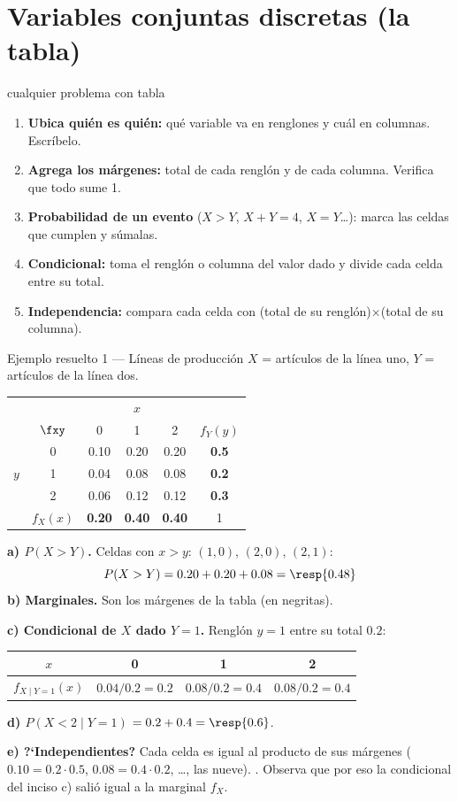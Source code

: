 \section{Variables conjuntas discretas (la tabla)}

\begin{receta}{cualquier problema con tabla}
\begin{enumerate}
\item \textbf{Ubica qui\'en es qui\'en:} qu\'e variable va en renglones y cu\'al en columnas. Escr\'ibelo.
\item \textbf{Agrega los m\'argenes:} total de cada rengl\'on y de cada columna. Verifica que todo sume 1.
\item \textbf{Probabilidad de un evento} ($X>Y$, $X+Y=4$, $X=Y$\ldots): marca las celdas que cumplen y s\'umalas.
\item \textbf{Condicional:} toma el rengl\'on o columna del valor dado y divide cada celda entre su total.
\item \textbf{Independencia:} compara cada celda con (total de su rengl\'on)$\times$(total de su columna).
\end{enumerate}
\end{receta}

\begin{ejemplo}{Ejemplo resuelto 1 --- L\'ineas de producci\'on }
$X$ = art\'iculos de la l\'inea uno, $Y$ = art\'iculos de la l\'inea dos.
\begin{center}
\begin{tabular}{cc|ccc|c}
 & & \multicolumn{3}{c|}{$x$} & \\
 & $\fxy$ & 0 & 1 & 2 & $f_Y(y)$\\ \hline
 \multirow{3}{*}{$y$} & 0 & 0.10 & 0.20 & 0.20 & \textbf{0.5}\\
 & 1 & 0.04 & 0.08 & 0.08 & \textbf{0.2}\\
 & 2 & 0.06 & 0.12 & 0.12 & \textbf{0.3}\\ \hline
 & $f_X(x)$ & \textbf{0.20} & \textbf{0.40} & \textbf{0.40} & 1
\end{tabular}
\end{center}
\textbf{a) $P(X>Y)$.} Celdas con $x>y$: $(1,0)$, $(2,0)$, $(2,1)$:
\[P(X>Y)=0.20+0.20+0.08=\resp{0.48}\]
\textbf{b) Marginales.} Son los m\'argenes de la tabla (en negritas).

\textbf{c) Condicional de $X$ dado $Y=1$.} Rengl\'on $y=1$ entre su total $0.2$:
\begin{center}
\begin{tabular}{c|ccc}
$x$ & 0 & 1 & 2\\ \hline
$f_{X\mid Y=1}(x)$ & $0.04/0.2=0.2$ & $0.08/0.2=0.4$ & $0.08/0.2=0.4$
\end{tabular}
\end{center}
\textbf{d) $P(X<2\mid Y=1)$} $=0.2+0.4=\resp{0.6}$.

\textbf{e) ?`Independientes?} Cada celda es igual al producto de sus m\'argenes
($0.10=0.2\cdot0.5$, $0.08=0.4\cdot0.2$, \ldots, las nueve). .
Observa que por eso la condicional del inciso c) sali\'o igual a la marginal $f_X$.
\end{ejemplo}

